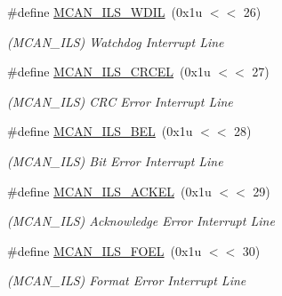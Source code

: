 \begin{DoxyCompactItemize}
\mbox{\label{group__SAMV71__MCAN_ga0fc832145f6978f9ab1d7dce7ced1f36}} 
\#define \mbox{\hyperlink{group__SAMV71__MCAN_ga0fc832145f6978f9ab1d7dce7ced1f36}{M\+C\+A\+N\+\_\+\+I\+L\+S\+\_\+\+W\+D\+IL}}~(0x1u $<$$<$ 26)
\begin{DoxyCompactList}\small\item\em (M\+C\+A\+N\+\_\+\+I\+LS) Watchdog Interrupt Line \end{DoxyCompactList}\item 
\mbox{\label{group__SAMV71__MCAN_ga68137e57af102a559d93d3410ee203f5}} 
\#define \mbox{\hyperlink{group__SAMV71__MCAN_ga68137e57af102a559d93d3410ee203f5}{M\+C\+A\+N\+\_\+\+I\+L\+S\+\_\+\+C\+R\+C\+EL}}~(0x1u $<$$<$ 27)
\begin{DoxyCompactList}\small\item\em (M\+C\+A\+N\+\_\+\+I\+LS) C\+RC Error Interrupt Line \end{DoxyCompactList}\item 
\mbox{\label{group__SAMV71__MCAN_ga87781f95e0d9a5e03afe4e91386e3081}} 
\#define \mbox{\hyperlink{group__SAMV71__MCAN_ga87781f95e0d9a5e03afe4e91386e3081}{M\+C\+A\+N\+\_\+\+I\+L\+S\+\_\+\+B\+EL}}~(0x1u $<$$<$ 28)
\begin{DoxyCompactList}\small\item\em (M\+C\+A\+N\+\_\+\+I\+LS) Bit Error Interrupt Line \end{DoxyCompactList}\item 
\mbox{\label{group__SAMV71__MCAN_gacbc1d7720db5dbf6b5d8d7e0f2c975e2}} 
\#define \mbox{\hyperlink{group__SAMV71__MCAN_gacbc1d7720db5dbf6b5d8d7e0f2c975e2}{M\+C\+A\+N\+\_\+\+I\+L\+S\+\_\+\+A\+C\+K\+EL}}~(0x1u $<$$<$ 29)
\begin{DoxyCompactList}\small\item\em (M\+C\+A\+N\+\_\+\+I\+LS) Acknowledge Error Interrupt Line \end{DoxyCompactList}\item 
\mbox{\label{group__SAMV71__MCAN_ga2ea2130ed2bdb49025f5abcfd2cfa0f0}} 
\#define \mbox{\hyperlink{group__SAMV71__MCAN_ga2ea2130ed2bdb49025f5abcfd2cfa0f0}{M\+C\+A\+N\+\_\+\+I\+L\+S\+\_\+\+F\+O\+EL}}~(0x1u $<$$<$ 30)
\begin{DoxyCompactList}\small\item\em (M\+C\+A\+N\+\_\+\+I\+LS) Format Error Interrupt Line \end{DoxyCompactList}\item 
$$
\end{DoxyCompactItemize}
